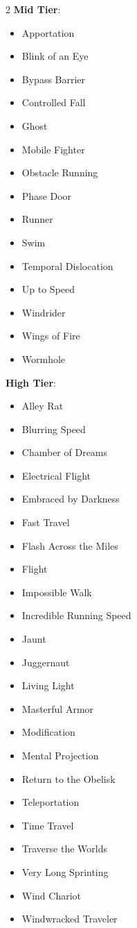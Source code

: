 \begin{multicols}{2}
\textbf{Mid Tier}:

\begin{itemize}
\item Apportation
\item Blink of an Eye
\item Bypass Barrier
\item Controlled Fall
\item Ghost
\item Mobile Fighter
\item Obstacle Running
\item Phase Door
\item Runner
\item Swim
\item Temporal Dislocation
\item Up to Speed
\item Windrider
\item Wings of Fire
\item Wormhole
\end{itemize}

\textbf{High Tier}:

\begin{itemize}
\item Alley Rat
\item Blurring Speed
\item Chamber of Dreams
\item Electrical Flight
\item Embraced by Darkness
\item Fast Travel
\item Flash Across the Miles
\item Flight
\item Impossible Walk
\item Incredible Running Speed
\item Jaunt
\item Juggernaut
\item Living Light
\item Masterful Armor
\item Modification
\item Mental Projection
\item Return to the Obelisk
\item Teleportation
\item Time Travel
\item Traverse the Worlds
\item Very Long Sprinting
\item Wind Chariot
\item Windwracked Traveler
\end{itemize}


\end{multicols}
